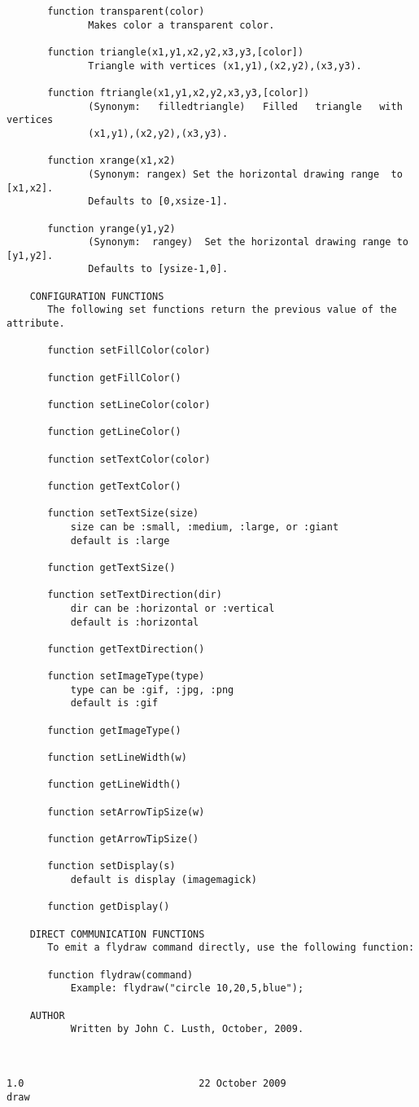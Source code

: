 \begin{codesize}
\begin{verbatim}
       function transparent(color)
              Makes color a transparent color.

       function triangle(x1,y1,x2,y2,x3,y3,[color])
              Triangle with vertices (x1,y1),(x2,y2),(x3,y3).

       function ftriangle(x1,y1,x2,y2,x3,y3,[color])
              (Synonym:   filledtriangle)   Filled   triangle   with  vertices
              (x1,y1),(x2,y2),(x3,y3).

       function xrange(x1,x2)
              (Synonym: rangex) Set the horizontal drawing range  to  [x1,x2].
              Defaults to [0,xsize-1].

       function yrange(y1,y2)
              (Synonym:  rangey)  Set the horizontal drawing range to [y1,y2].
              Defaults to [ysize-1,0].

    CONFIGURATION FUNCTIONS
       The following set functions return the previous value of the attribute.

       function setFillColor(color)

       function getFillColor()

       function setLineColor(color)

       function getLineColor()

       function setTextColor(color)

       function getTextColor()

       function setTextSize(size) 
           size can be :small, :medium, :large, or :giant
           default is :large

       function getTextSize()

       function setTextDirection(dir)
           dir can be :horizontal or :vertical
           default is :horizontal

       function getTextDirection()

       function setImageType(type)
           type can be :gif, :jpg, :png
           default is :gif

       function getImageType()

       function setLineWidth(w)

       function getLineWidth()

       function setArrowTipSize(w)

       function getArrowTipSize()

       function setDisplay(s)
           default is display (imagemagick)

       function getDisplay()

    DIRECT COMMUNICATION FUNCTIONS
       To emit a flydraw command directly, use the following function:

       function flydraw(command)
           Example: flydraw("circle 10,20,5,blue");

    AUTHOR
           Written by John C. Lusth, October, 2009.



1.0                              22 October 2009                          draw
\end{verbatim}
\end{codesize}
\color{black}



